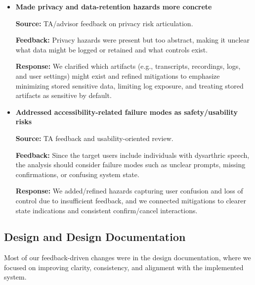 \documentclass{article}
\begin{document}
\begin{itemize}
\textbf{Source:} TA feedback and internal risk review after implementing command
execution flows.

\textbf{Feedback:} The hazard analysis under-emphasized risks from
misrecognition, ambiguous intent, and executing harmful browser actions.

\textbf{Response:} We strengthened hazards and mitigations around incorrect
transcriptions and ambiguous commands leading to unintended actions. Mitigations
were updated to emphasize explicit confirmation for higher-risk actions, clear
user feedback during execution, and safe fallback behaviour when commands are
out-of-scope or low-confidence.

\item \textbf{Made privacy and data-retention hazards more concrete}

\textbf{Source:} TA/advisor feedback on privacy risk articulation.

\textbf{Feedback:} Privacy hazards were present but too abstract, making it
unclear what data might be logged or retained and what controls exist.

\textbf{Response:} We clarified which artifacts (e.g., transcripts, recordings,
logs, and user settings) might exist and refined mitigations to emphasize
minimizing stored sensitive data, limiting log exposure, and treating stored
artifacts as sensitive by default.

\item \textbf{Addressed accessibility-related failure modes as safety/usability risks}

\textbf{Source:} TA feedback and usability-oriented review.

\textbf{Feedback:} Since the target users include individuals with dysarthric
speech, the analysis should consider failure modes such as unclear prompts,
missing confirmations, or confusing system state.

\textbf{Response:} We added/refined hazards capturing user confusion and loss of
control due to insufficient feedback, and we connected mitigations to clearer
state indications and consistent confirm/cancel interactions.

\end{itemize}

\subsection{Design and Design Documentation}

Most of our feedback-driven changes were in the design documentation, where we
focused on improving clarity, consistency, and alignment with the implemented
system.
\end{document}
